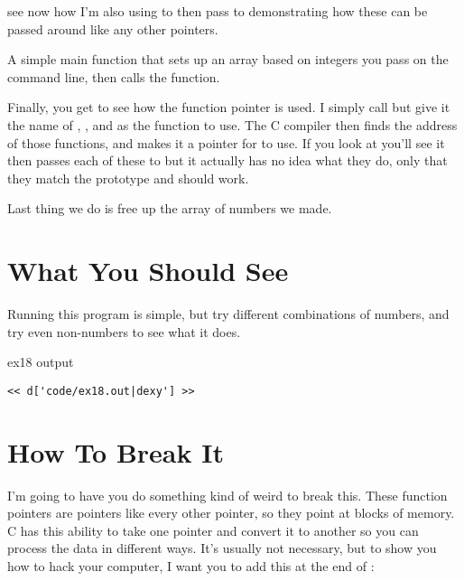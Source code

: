 \begin{description}
    see now how I'm also using  to then pass to 
    demonstrating how these can be passed around like any other pointers.
\item [90-103] A simple main function that sets up an array based on integers
    you pass on the command line, then calls the  function.
\item [105-107] Finally, you get to see how the  function
    pointer  is used.  I simply call  but
    give it the name of , , and 
     as the function to use.  The C compiler then finds
    the address of those functions, and makes it a pointer for 
     to use.  If you look at  you'll
    see it then passes each of these to  but it actually
    has no idea what they do, only that they match the  
    prototype and should work.
\item[ex18.c:109] Last thing we do is free up the array of numbers we made.
\end{description}


\section{What You Should See}

Running this program is simple, but try different combinations of numbers, and
try even non-numbers to see what it does.

\begin{code}{ex18 output}
\begin{lstlisting}
<< d['code/ex18.out|dexy'] >>
\end{lstlisting}
\end{code}


\section{How To Break It}

I'm going to have you do something kind of weird to break this.  These function
pointers are pointers like every other pointer, so they point at blocks of
memory.  C has this ability to take one pointer and convert it to another so
you can process the data in different ways.  It's usually not necessary, but
to show you how to hack your computer, I want you to add this at the end of
:

